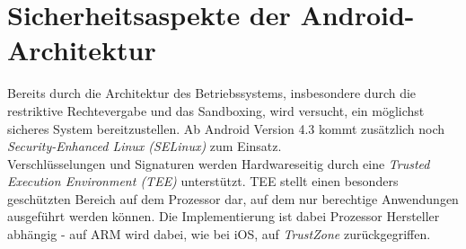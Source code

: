 \section{Sicherheitsaspekte der Android-Architektur}

	Bereits durch die Architektur des Betriebssystems, insbesondere durch die restriktive Rechtevergabe und das Sandboxing, wird versucht, ein möglichst sicheres System bereitzustellen. Ab Android Version 4.3 kommt zusätzlich noch \textit{Security-Enhanced Linux (SELinux)} zum Einsatz.\\
	Verschlüsselungen und Signaturen werden Hardwareseitig durch eine \textit{Trusted Execution Environment (TEE)} unterstützt. TEE stellt einen besonders geschützten Bereich auf dem Prozessor dar, auf dem nur berechtige Anwendungen ausgeführt werden können. Die Implementierung ist dabei Prozessor Hersteller abhängig - auf ARM wird dabei, wie bei iOS, auf \textit{TrustZone}\cite{TEE_ARM} zurückgegriffen.
	
